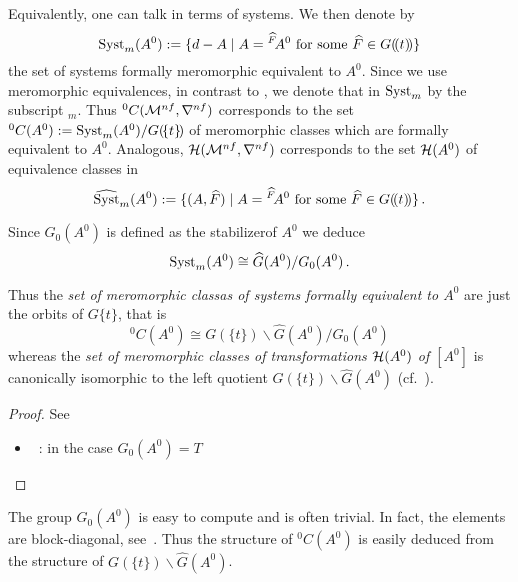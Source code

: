 Equivalently, one can talk in terms of systems. We then denote by
\[
  \operatorname{Syst}_m(A^0):=\{d-A
    \mid A={}^{\widehat F}\!A^0 \text{ for some } \widehat F\in G(\!(t)\!)\}
\]
the set of systems formally meromorphic equivalent to $A^0$.
Since we use meromorphic equivalences, in contrast to \cite{boalch,thboalch},
we denote that in $\operatorname{Syst}_m$ by the subscript ${}_m$.
Thus ${}^0C(\mathcal{M}^{nf},\nabla^{nf})$ corresponds to
the set ${}^0C(A^0):=\operatorname{Syst}_m(A^0)/G(\!\{t\}\!)$ of meromorphic classes which
are formally equivalent to $A^0$.
Analogous, $\mathcal{H}(\mathcal{M}^{nf},\nabla^{nf})$ corresponds to the set $\mathcal{H}(A^0)$ of
equivalence classes in
\[
  \widehat{\operatorname{Syst}}_m(A^0):=\{(A,\widehat F)
    \mid A={}^{\widehat F}\!A^0 \text{ for some } \widehat F\in G(\!(t)\!)\} \,.
\]

\begin{lem}
  Since $G_0(A^0)$ is defined as the stabilizer\TODO[correct?] of $A^0$ we deduce
  \[
    \operatorname{Syst}_m(A^0)\cong \widehat G(A^0)/G_0(A^0) \,.
  \]
  \begin{s-cor}
    Thus the \emph{set of meromorphic classas of systems formally equivalent
      to $A^0$} are just the orbits of $G\{t\}$, that is
    \[
      {}^0C(A^0)\cong G(\!\{t\}\!)\backslash\hat G(A^0)/G_0(A^0)
    \]
    whereas the \emph{set of meromorphic classes of transformations $\mathcal{H}(A^0)$
    of $[A^0]$} is canonically isomorphic to the left quotient
    $G(\!\{t\}\!)\backslash\hat G(A^0)$ (cf.\ \cite[Lem.1.17]{thboalch}).
  \end{s-cor}
\end{lem}
\begin{proof}
  See
  \begin{itemize}
    \item~\cite[6]{thboalch}: in the case $G_0(A^0)=T$
  \end{itemize}
\end{proof}

The group $G_0(A^0)$ is easy to compute and is often trivial. In fact, the
elements are block-diagonal, see~\cite[77]{Loday2014}.
Thus the structure of ${}^0C(A^0)$ is easily deduced from the structure of
$G(\!\{t\}\!)\backslash\hat G(A^0)$.
